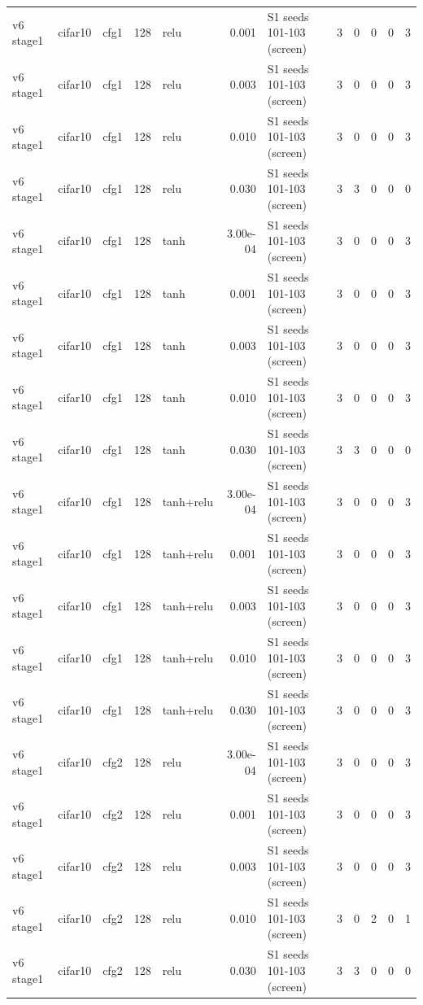\begin{table}[htbp]
{\begin{tabular}{@{}lllrlrlrrrrr@{}}
v6 stage1 & cifar10 & cfg1 & 128 & relu & 0.001 & S1 seeds 101-103 (screen) & 3 & 0 & 0 & 0 & 3 \\
v6 stage1 & cifar10 & cfg1 & 128 & relu & 0.003 & S1 seeds 101-103 (screen) & 3 & 0 & 0 & 0 & 3 \\
v6 stage1 & cifar10 & cfg1 & 128 & relu & 0.010 & S1 seeds 101-103 (screen) & 3 & 0 & 0 & 0 & 3 \\
v6 stage1 & cifar10 & cfg1 & 128 & relu & 0.030 & S1 seeds 101-103 (screen) & 3 & 3 & 0 & 0 & 0 \\
v6 stage1 & cifar10 & cfg1 & 128 & tanh & 3.00e-04 & S1 seeds 101-103 (screen) & 3 & 0 & 0 & 0 & 3 \\
v6 stage1 & cifar10 & cfg1 & 128 & tanh & 0.001 & S1 seeds 101-103 (screen) & 3 & 0 & 0 & 0 & 3 \\
v6 stage1 & cifar10 & cfg1 & 128 & tanh & 0.003 & S1 seeds 101-103 (screen) & 3 & 0 & 0 & 0 & 3 \\
v6 stage1 & cifar10 & cfg1 & 128 & tanh & 0.010 & S1 seeds 101-103 (screen) & 3 & 0 & 0 & 0 & 3 \\
v6 stage1 & cifar10 & cfg1 & 128 & tanh & 0.030 & S1 seeds 101-103 (screen) & 3 & 3 & 0 & 0 & 0 \\
v6 stage1 & cifar10 & cfg1 & 128 & tanh+relu & 3.00e-04 & S1 seeds 101-103 (screen) & 3 & 0 & 0 & 0 & 3 \\
v6 stage1 & cifar10 & cfg1 & 128 & tanh+relu & 0.001 & S1 seeds 101-103 (screen) & 3 & 0 & 0 & 0 & 3 \\
v6 stage1 & cifar10 & cfg1 & 128 & tanh+relu & 0.003 & S1 seeds 101-103 (screen) & 3 & 0 & 0 & 0 & 3 \\
v6 stage1 & cifar10 & cfg1 & 128 & tanh+relu & 0.010 & S1 seeds 101-103 (screen) & 3 & 0 & 0 & 0 & 3 \\
v6 stage1 & cifar10 & cfg1 & 128 & tanh+relu & 0.030 & S1 seeds 101-103 (screen) & 3 & 0 & 0 & 0 & 3 \\
v6 stage1 & cifar10 & cfg2 & 128 & relu & 3.00e-04 & S1 seeds 101-103 (screen) & 3 & 0 & 0 & 0 & 3 \\
v6 stage1 & cifar10 & cfg2 & 128 & relu & 0.001 & S1 seeds 101-103 (screen) & 3 & 0 & 0 & 0 & 3 \\
v6 stage1 & cifar10 & cfg2 & 128 & relu & 0.003 & S1 seeds 101-103 (screen) & 3 & 0 & 0 & 0 & 3 \\
v6 stage1 & cifar10 & cfg2 & 128 & relu & 0.010 & S1 seeds 101-103 (screen) & 3 & 0 & 2 & 0 & 1 \\
v6 stage1 & cifar10 & cfg2 & 128 & relu & 0.030 & S1 seeds 101-103 (screen) & 3 & 3 & 0 & 0 & 0 \\

\end{tabular}}
\end{table}
